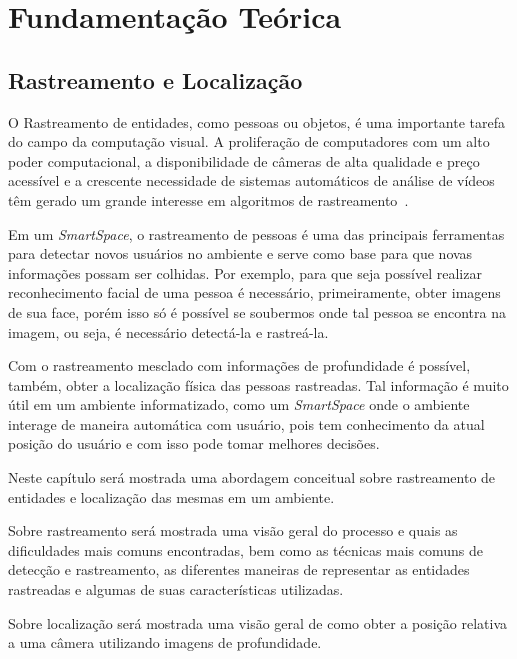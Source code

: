 \chapter{Fundamentação Teórica}

\section{Rastreamento e Localização}

	O Rastreamento de entidades, como pessoas ou objetos, é uma importante tarefa do campo da computação visual. A proliferação de computadores com um alto poder computacional, a disponibilidade de câmeras de alta qualidade e preço acessível e a crescente necessidade de sistemas automáticos de análise de vídeos têm gerado um grande interesse em algoritmos de rastreamento~\cite{yilmaz}.

	Em um \textit{SmartSpace}, o rastreamento de pessoas é uma das principais ferramentas para detectar novos usuários no ambiente e serve como base para que novas informações possam ser colhidas. Por exemplo, para que seja possível realizar reconhecimento facial de uma pessoa é necessário, primeiramente, obter imagens de sua face, porém isso só é possível se soubermos onde tal pessoa se encontra na imagem, ou seja, é necessário detectá-la e rastreá-la.

	Com o rastreamento mesclado com informações de profundidade é possível, também, obter a localização física das pessoas rastreadas. Tal informação é muito útil em um ambiente informatizado, como um \textit{SmartSpace} onde o ambiente interage de maneira automática com usuário, pois tem conhecimento da atual posição do usuário e com isso pode tomar melhores decisões.

	Neste capítulo será mostrada uma abordagem conceitual sobre rastreamento de entidades e localização das mesmas em um ambiente.

	Sobre rastreamento será mostrada uma visão geral do processo e quais as dificuldades mais comuns encontradas, bem como as técnicas mais comuns de detecção e rastreamento, as diferentes maneiras de representar as entidades rastreadas e algumas de suas características utilizadas.

	Sobre localização será mostrada uma visão geral de como obter a posição relativa a uma câmera utilizando imagens de profundidade.

	
	

